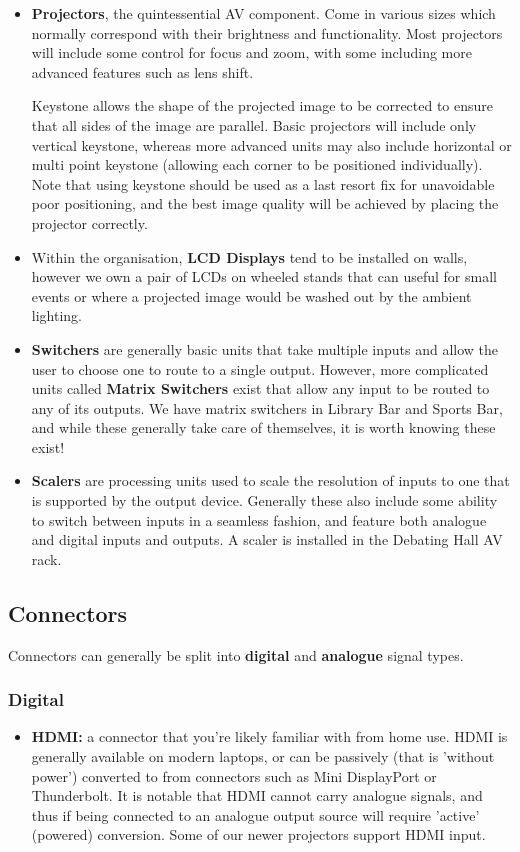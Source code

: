 \documentclass[14pt]{article} %
\begin{document}
\begin{itemize}
\item \textbf{Projectors}, the quintessential AV component. Come in various sizes which normally correspond with their brightness and functionality. Most projectors will include some control for focus and zoom, with some including more advanced features such as lens shift.

Keystone allows the shape of the projected image to be corrected to ensure that all sides of the image are parallel. Basic projectors will include only vertical keystone, whereas more advanced units may also include horizontal or multi point keystone (allowing each corner to be positioned individually). Note that using keystone should be used as a last resort fix for unavoidable poor positioning, and the best image quality will be achieved by placing the projector correctly.

\item Within the organisation, \textbf{LCD Displays} tend to be installed on walls, however we own a pair of LCDs on wheeled stands that can useful for small events or where a projected image would be washed out by the ambient lighting.

\item \textbf{Switchers} are generally basic units that take multiple inputs and allow the user to choose one to route to a single output. However, more complicated units called \textbf{Matrix Switchers} exist that allow any input to be routed to any of its outputs. We have matrix switchers in Library Bar and Sports Bar, and while these generally take care of themselves, it is worth knowing these exist!

\item \textbf{Scalers} are processing units used to scale the resolution of inputs to one that is supported by the output device. Generally these also include some ability to switch between inputs in a seamless fashion, and feature both analogue and digital inputs and outputs. A scaler is installed in the Debating Hall AV rack.
\end{itemize}

\subsection{Connectors}

Connectors can generally be split into \textbf{digital} and \textbf{analogue} signal types. 

\subsubsection{Digital}
\begin{itemize}
\item \textbf{HDMI: } a connector that you're likely familiar with from home use. HDMI is generally available on modern laptops, or can be passively (that is 'without power') converted to from connectors such as Mini DisplayPort or Thunderbolt. It is notable that HDMI cannot carry analogue signals, and thus if being connected to an analogue output source will require 'active' (powered) conversion. Some of our newer projectors support HDMI input.
\end{itemize}
\end{document}
